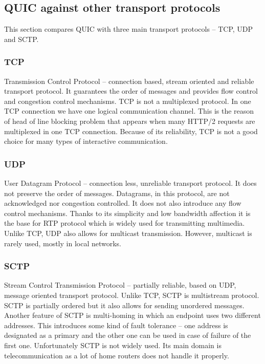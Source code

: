 \subsection{QUIC against other transport protocols}
\label{subsec:quic_against_other_transport_protocols}
This section compares QUIC with three main transport protocols -- TCP, UDP and SCTP\@.

\subsubsection{TCP}
Transmission Control Protocol -- connection based, stream oriented and reliable transport protocol.
It guarantees the order of messages and provides flow control and congestion control mechanisms.
TCP is not a multiplexed protocol.
In one TCP connection we have one logical communication channel.
This is the reason of head of line blocking problem that appears when many HTTP/2 requests are multiplexed in one TCP connection.
Because of its reliability, TCP is not a good choice for many types of interactive communication.

\subsubsection{UDP}
User Datagram Protocol -- connection less, unreliable transport protocol.
It does not preserve the order of messages.
Datagrams, in this protocol, are not acknowledged nor congestion controlled.
It does not also introduce any flow control mechanisms.
Thanks to its simplicity and low bandwidth affection it is the base for RTP protocol which is widely used for transmitting multimedia.
Unlike TCP, UDP also allows for multicast transmission.
However, multicast is rarely used, mostly in local networks.

\subsubsection{SCTP}
Stream Control Transmission Protocol -- partially reliable, based on UDP, message oriented transport protocol.
Unlike TCP, SCTP is multistream protocol.
SCTP is partially ordered but it also allows for sending unordered messages.
Another feature of SCTP is multi-homing in which an endpoint uses two different addresses.
This introduces some kind of fault tolerance -- one address is designated as a primary and the other one can be used in case of failure of the first one.
Unfortunately SCTP is not widely used.
Its main domain is telecommunication as a lot of home routers does not handle it properly.

